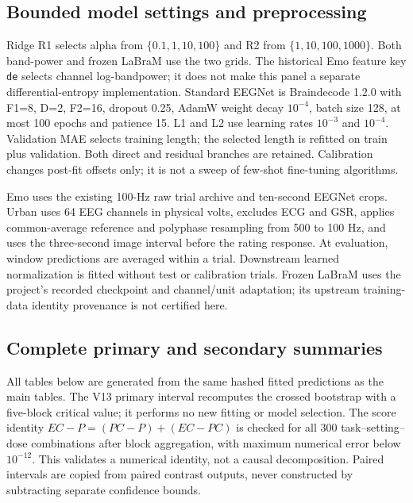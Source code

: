 \subsection{Bounded model settings and preprocessing}
Ridge R1 selects alpha from $\{0.1,1,10,100\}$ and R2 from
$\{1,10,100,1000\}$. Both band-power and frozen LaBraM use the two grids.
The historical Emo feature key \texttt{de} selects channel log-bandpower; it
does not make this panel a separate differential-entropy implementation.
Standard EEGNet is Braindecode 1.2.0 with F1=8, D=2, F2=16, dropout 0.25,
AdamW weight decay $10^{-4}$, batch size 128, at most 100 epochs and patience
15. L1 and L2 use learning rates $10^{-3}$ and $10^{-4}$. Validation MAE
selects training length; the selected length is refitted on train plus
validation. Both direct and residual branches are retained. Calibration changes
post-fit offsets only; it is not a sweep of few-shot fine-tuning algorithms.

Emo uses the existing 100-Hz raw trial archive and ten-second EEGNet crops.
Urban uses 64 EEG channels in physical volts, excludes ECG and GSR, applies
common-average reference and polyphase resampling from 500 to 100 Hz, and
uses the three-second image interval before the rating response. At evaluation,
window predictions are averaged within a trial. Downstream learned
normalization is fitted without test or calibration trials. Frozen LaBraM
uses the project's recorded checkpoint and channel/unit adaptation; its upstream
training-data identity provenance is not certified here.

\subsection{Complete primary and secondary summaries}
All tables below are generated from the same hashed fitted predictions as the
main tables. The V13 primary interval recomputes the crossed bootstrap with a
five-block critical value; it performs no new fitting or model selection. The
score identity $EC-P=(PC-P)+(EC-PC)$ is checked
for all 300 task--setting--dose combinations after block aggregation, with
maximum numerical error below $10^{-12}$. This validates a numerical identity,
not a causal decomposition. Paired intervals are copied from paired contrast
outputs, never constructed by subtracting separate confidence bounds.


